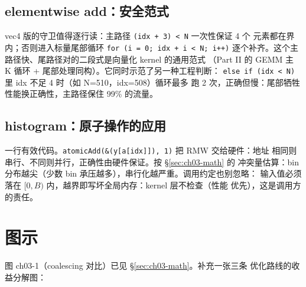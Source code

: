 \subsection{elementwise add：安全范式}



vec4 版的守卫值得逐行读：主路径 \texttt{(idx + 3) < N} 一次性保证 4 个
元素都在界内；否则进入标量尾部循环 \texttt{for (i = 0; idx + i < N; i++)}
逐个补齐。这个主路径快、尾路径对的二段式是向量化 kernel 的通用范式
（Part II 的 GEMM 主 K 循环 + 尾部处理同构）。它同时示范了另一种工程判断：
\texttt{else if (idx < N)} 里 idx 不足 4 时（如 N=510，idx=508）循环最多
跑 2 次，正确但慢：尾部牺牲性能换正确性，主路径保住 99\% 的流量。

\subsection{histogram：原子操作的应用}



一行有效代码。\texttt{atomic\allowbreak{}Add\allowbreak{}(\&\allowbreak{}(y[a[idx]]),\allowbreak{} 1)} 把 RMW 交给硬件：地址
相同则串行、不同则并行，正确性由硬件保证。按 \S\ref{sec:ch03-math} 的
冲突量估算：bin 分布越尖（少数 bin 承压越多），串行化越严重。调用约定也别忽略：
输入值必须落在 $[0, B)$ 内，越界即写坏全局内存：kernel 层不检查（性能
优先），这是调用方的责任。

\section{图示}

图 ch03-1（coalescing 对比）已见 \S\ref{sec:ch03-math}。补充一张三条
优化路线的收益分解图：

